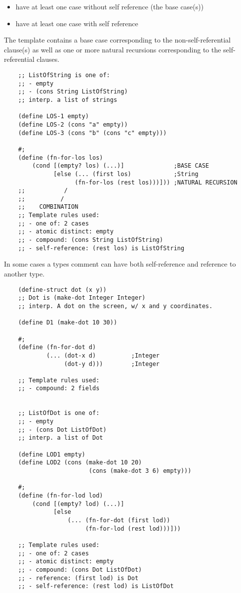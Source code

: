 \documentclass[11pt,a4paper]{report}
\begin{document}
	\begin{itemize}
		\item have at least one case without self reference (the base case(s))
		\item have at least one case with self reference
	\end{itemize}

	The template contains a base case corresponding to the non-self-referential clause(s) as well as
	one or more natural recursions corresponding to the self-referential clauses.
	
	\begin{verbatim}
	;; ListOfString is one of:
	;; - empty
	;; - (cons String ListOfString)
	;; interp. a list of strings
	
	(define LOS-1 empty)
	(define LOS-2 (cons "a" empty))
	(define LOS-3 (cons "b" (cons "c" empty)))
	
	#;
	(define (fn-for-los los)
		(cond [(empty? los) (...)]              ;BASE CASE
		      [else (... (first los)            ;String
		            (fn-for-los (rest los)))])) ;NATURAL RECURSION
	;;	         /
	;;	        /
	;;	  COMBINATION
	;; Template rules used:
	;; - one of: 2 cases
	;; - atomic distinct: empty
	;; - compound: (cons String ListOfString)
	;; - self-reference: (rest los) is ListOfString
	\end{verbatim}
	
	In some cases a types comment can have both self-reference and reference to another type.
	
	\begin{verbatim}
	(define-struct dot (x y))
	;; Dot is (make-dot Integer Integer)
	;; interp. A dot on the screen, w/ x and y coordinates.
	
	(define D1 (make-dot 10 30))
	
	#;
	(define (fn-for-dot d)
	        (... (dot-x d)          ;Integer
	             (dot-y d)))        ;Integer
	
	;; Template rules used:
	;; - compound: 2 fields
	
	
	;; ListOfDot is one of:
	;; - empty
	;; - (cons Dot ListOfDot)
	;; interp. a list of Dot
	
	(define LOD1 empty)
	(define LOD2 (cons (make-dot 10 20) 
	                    (cons (make-dot 3 6) empty)))
	
	#;
	(define (fn-for-lod lod)
		(cond [(empty? lod) (...)]
		      [else
		          (... (fn-for-dot (first lod))
		               (fn-for-lod (rest lod)))]))
	
	;; Template rules used:
	;; - one of: 2 cases
	;; - atomic distinct: empty
	;; - compound: (cons Dot ListOfDot)
	;; - reference: (first lod) is Dot
	;; - self-reference: (rest lod) is ListOfDot
	\end{verbatim}
	
\end{document}
